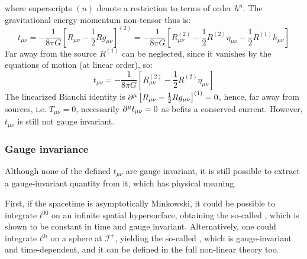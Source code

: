 where superscripts $ (n) $ denote a restriction to terms of order $ h^n $. The gravitational energy-momentum non-tensor thus is:
\begin{equation*}
  t_{\mu \nu} = - \frac{1}{8\pi G} \left[ R_{\mu \nu} - \frac{1}{2} R g_{\mu \nu} \right]^{(2)} = - \frac{1}{8\pi G} \left[ R^{(2)}_{\mu \nu} - \frac{1}{2} R^{(2)} \eta_{\mu \nu} - \frac{1}{2} R^{(1)} h_{\mu \nu} \right]
\end{equation*}
Far away from the source $ R^{(1)} $ can be neglected, since it vanishes by the equations of motion (at linear order), so:
\begin{equation}
  t_{\mu \nu} = - \frac{1}{8\pi G} \left[ R^{(2)}_{\mu \nu} - \frac{1}{2} R^{(2)} \eta_{\mu \nu} \right]
  \label{eq:5.30}
\end{equation}
The linearized Bianchi identity is $ \partial^\mu \left[ R_{\mu \nu} - \frac{1}{2} R g_{\mu \nu} \right]^{(1)} = 0 $, hence, far away from sources, i.e. $ T_{\mu \nu} = 0 $, necessarily $ \partial^\mu t_{\mu \nu} = 0 $ as befits a conserved current. However, $ t_{\mu \nu} $ is still not gauge invariant.

\subsubsection{Gauge invariance}

Although none of the defined $ t_{\mu \nu} $ are gauge invariant, it is still possible to extract a gauge-invariant quantity from it, which has physical meaning.

First, if the spacetime is asymptotically Minkowski, it could be possible to integrate $ t^{00} $ on an infinite spatial hypersurface, obtaining the so-called , which is shown to be constant in time and gauge invariant. Alternatively, one could integrate $ t^{0i} $ on a sphere at $ \mathcal{I}^+ $, yielding the so-called , which is gauge-invariant and time-dependent, and it can be defined in the full non-linear theory too.


